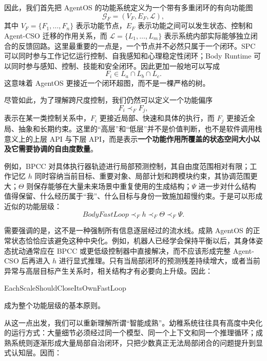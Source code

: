 因此，我们首先把 AgentOS 的功能系统定义为一个带有多重闭环的有向功能图
\[
\mathcal G_F
=
(V_F,E_F,\mathcal L),
\]
其中 $V_F=\{F_1,\ldots,F_n\}$ 表示功能节点，$E_F$ 表示功能之间可以发生状态、控制和 Agent-CSO 迁移的作用关系，而 $\mathcal L=\{L_1,\ldots,L_m\}$ 表示系统内部实际能够独立闭合的反馈回路。这里最重要的一点是，一个节点并不必然只属于一个闭环。SPC 可以同时参与工作记忆运行控制、自我感知和心理稳定性闭环；Body Runtime 可以同时参与感知、控制、技能和安全闭环。因此更加一般地可以写成
\[
F_i\in L_a\cap L_b\cap L_c.
\]
这意味着 AgentOS 更接近一个闭环超图，而不是一棵严格的树。

尽管如此，为了理解跨尺度控制，我们仍然可以定义一个功能偏序
\[
F_i\prec_F F_j,
\]
表示在某一类控制关系中，$F_i$ 更接近局部、快速和具体的执行，而 $F_j$ 更接近全局、抽象和长期约束。这里的“高层”和“低层”并不是价值判断，也不是软件调用栈意义上的上层 API 与下层 API，而是表示\textbf{一个功能作用所覆盖的状态空间大小以及它需要协调的自由度数量}。

例如，BPCC 对具体执行器轨迹进行局部预测控制，其自由度范围相对有限；工作记忆 $h$ 同时容纳当前目标、重要对象、局部计划和跨模块约束，其协调范围更大；$\Theta$ 则保存能够在大量未来场景中重复使用的生成结构；$\Psi$ 进一步对什么结构值得保留、什么经历属于“我”、什么目标与身份一致施加超慢约束。于是可以形成近似的功能层级：
\[
BodyFastLoop
\prec_F
h
\prec_F
\Theta
\prec_F
\Psi.
\]

需要强调的是，这不是一种强制所有信息逐层经过的流水线。成熟 AgentOS 的正常状态恰恰应该避免这种中央化。例如，机器人已经学会保持平衡以后，其身体姿态扰动通常应在 BPCC 或更低级控制器中直接解决，而不应该形成完整 Agent-CSO 后再进入 $h$ 进行显式推理。只有当局部闭环的预测残差持续增大，或者当前异常与高层目标产生关系时，相关结构才有必要向上升级。因此：

\begin{statementbox}
EachScaleShouldCloseItsOwnFastLoop
\end{statementbox}

成为整个功能层级的基本原则。

从这一点出发，我们可以重新理解所谓“智能成熟”。幼稚系统往往具有高度中央化的运行方式：大量细节必须经过同一个模型、同一个上下文和同一个推理循环；成熟系统则逐渐形成大量局部自治闭环，只把少数真正无法局部闭合的问题提升到显式认知层。因而：

\begin{statementbox}
\centering
{}
\end{statementbox}

